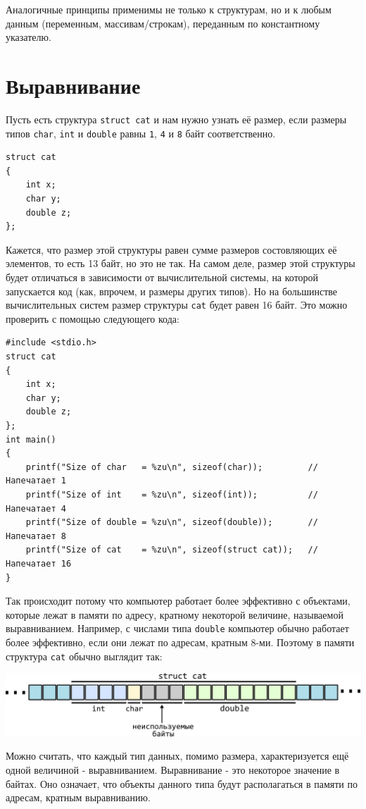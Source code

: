 \documentclass[10pt]{article}
\begin{document}
\noindent 
Аналогичные принципы применимы не только к структурам, но и к любым данным (переменным, массивам/строкам), переданным по константному указателю.

\newpage


\newpage
\section*{Выравнивание}
Пусть есть структура \texttt{struct cat} и нам нужно узнать её размер, если размеры типов \texttt{char}, \texttt{int} и \texttt{double} равны \texttt{1}, \texttt{4} и \texttt{8} байт соответственно.
\begin{lstlisting}
struct cat 
{
    int x;
    char y;
    double z;
};
\end{lstlisting}
Кажется, что размер этой структуры равен сумме размеров состовляющих её элементов, то есть 13 байт, но это не так. На самом деле, размер этой структуры будет отличаться в зависимости от вычислительной системы, на которой запускается код (как, впрочем, и размеры других типов). Но на большинстве вычислительных систем размер структуры \texttt{cat} будет равен 16 байт. Это можно проверить с помощью следующего кода:
\begin{lstlisting}
#include <stdio.h>
struct cat 
{
    int x;
    char y;
    double z;
};
int main() 
{
    printf("Size of char   = %zu\n", sizeof(char));			// Напечатает 1
    printf("Size of int    = %zu\n", sizeof(int));			// Напечатает 4
    printf("Size of double = %zu\n", sizeof(double));		// Напечатает 8
    printf("Size of cat    = %zu\n", sizeof(struct cat));	// Напечатает 16
}
\end{lstlisting}
Так происходит потому что компьютер работает более эффективно с объектами, которые лежат в памяти по адресу, кратному некоторой величине, называемой выравниванием. Например, с числами типа \texttt{double} компьютер обычно работает более эффективно, если они лежат по адресам, кратным 8-ми. Поэтому в памяти структура \texttt{cat} обычно выглядит так: 

\begin{center}
\includegraphics[scale=1]{../images/alignment.png}
\end{center}
Можно считать, что каждый тип данных, помимо размера, характеризуется ещё одной величиной - выравниванием. Выравнивание - это некоторое значение в байтах. Оно означает, что объекты данного типа будут располагаться в памяти по адресам, кратным выравниванию.
\end{document}
